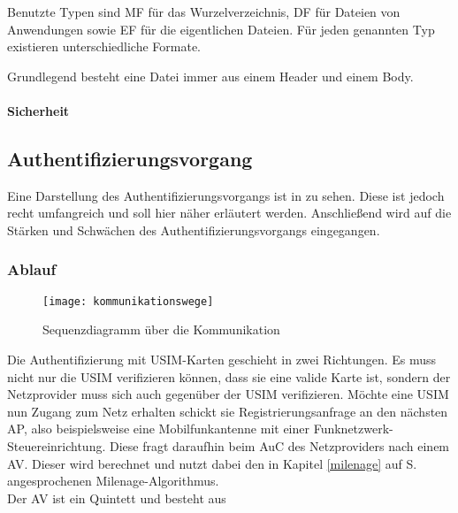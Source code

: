 Benutzte Typen sind \ac{MF} für das Wurzelverzeichnis,
\ac{DF} für Dateien von Anwendungen sowie
\ac{EF} für die eigentlichen Dateien. Für jeden genannten Typ
existieren unterschiedliche Formate.

Grundlegend besteht eine Datei immer aus einem Header und einem Body.

\paragraph{Sicherheit}

\subsection{Authentifizierungsvorgang}
\label{authentifizierungsvorgang}

Eine Darstellung des Authentifizierungsvorgangs ist in  zu
sehen. Diese ist jedoch recht umfangreich und soll hier näher erläutert werden. Anschließend
wird auf die Stärken und Schwächen des Authentifizierungsvorgangs eingegangen.

 \subsubsection{Ablauf}
 
 \begin{figure}[htp]
 \begin{center}
  \texttt{[image: kommunikationswege]}
 \end{center}
 \caption[Sequenzdiagramm über die Kommunikation zwischen SIM-Karte und Authentication Center]{Sequenzdiagramm über die Kommunikation}
 \label{fig:kommunikationswege}
\end{figure}

 Die Authentifizierung mit \ac{USIM}-Karten geschieht in zwei Richtungen. Es muss nicht nur die
 USIM verifizieren können, dass sie eine valide Karte ist, sondern der Netzprovider muss sich auch
 gegenüber der USIM verifizieren. Möchte eine USIM nun Zugang zum Netz erhalten schickt sie
 Registrierungsanfrage an den nächsten \ac{AP}, also beispielsweise eine Mobilfunkantenne mit
 einer Funknetzwerk-Steuereinrichtung. Diese fragt daraufhin beim \ac{AuC} des Netzproviders
 nach einem \ac{AV}. Dieser wird berechnet und nutzt dabei den in Kapitel \ref{milenage} auf S.
 \pageref{milenage} angesprochenen Milenage-Algorithmus. \\
 Der AV ist ein Quintett und besteht aus
 
